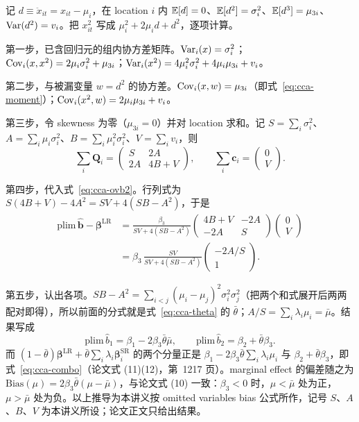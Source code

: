 \begin{intuition}
记 $d\equiv\ddot{x}_{it}=x_{it}-\mu_i$，在 location $i$ 内 $\mathbb{E}[d]=0$、$\mathbb{E}[d^2]=\sigma_i^2$、$\mathbb{E}[d^3]=\mu_{3i}$、$\operatorname{Var}(d^2)=v_i$。把 $x_{it}^2$ 写成 $\mu_i^2+2\mu_i d+d^2$，逐项计算。

第一步，已含回归元的组内协方差矩阵。$\operatorname{Var}_i(x)=\sigma_i^2$；$\operatorname{Cov}_i(x,x^2)=2\mu_i\sigma_i^2+\mu_{3i}$；$\operatorname{Var}_i(x^2)=4\mu_i^2\sigma_i^2+4\mu_i\mu_{3i}+v_i$。

第二步，与被漏变量 $w=d^2$ 的协方差。$\operatorname{Cov}_i(x,w)=\mu_{3i}$（即式~\ref{eq:cca-moment}）；$\operatorname{Cov}_i(x^2,w)=2\mu_i\mu_{3i}+v_i$。

第三步，令 skewness 为零（$\mu_{3i}=0$）并对 location 求和。记 $S=\sum_i\sigma_i^2$、$A=\sum_i\mu_i\sigma_i^2$、$B=\sum_i\mu_i^2\sigma_i^2$、$V=\sum_i v_i$，则
\begin{equation*}
\sum_i\mathbf{Q}_i=\begin{pmatrix} S & 2A\\ 2A & 4B+V\end{pmatrix},\qquad
\sum_i\mathbf{c}_i=\begin{pmatrix}0\\ V\end{pmatrix}.
\end{equation*}

第四步，代入式~\ref{eq:cca-ovb2}。行列式为 $S(4B+V)-4A^2=SV+4(SB-A^2)$，于是
\begin{align*}
\mathrm{plim}\,\widehat{\mathbf{b}}-\boldsymbol{\beta}^{\mathrm{LR}}
&=\frac{\beta_3}{SV+4(SB-A^2)}\begin{pmatrix}4B+V & -2A\\ -2A & S\end{pmatrix}\begin{pmatrix}0\\ V\end{pmatrix}\\
&=\beta_3\,\frac{SV}{SV+4(SB-A^2)}\begin{pmatrix}-2A/S\\ 1\end{pmatrix}.
\end{align*}

第五步，认出各项。$SB-A^2=\sum_{i<j}(\mu_i-\mu_j)^2\sigma_i^2\sigma_j^2$（把两个和式展开后两两配对即得），所以前面的分式就是式~\ref{eq:cca-theta} 的 $\bar\theta$；$A/S=\sum_i\lambda_i\mu_i=\bar\mu$。结果写成
\begin{equation*}
\mathrm{plim}\,\widehat{b}_1=\beta_1-2\beta_3\bar\theta\bar\mu,\qquad
\mathrm{plim}\,\widehat{b}_2=\beta_2+\bar\theta\beta_3 .
\end{equation*}
而 $(1-\bar\theta)\boldsymbol{\beta}^{\mathrm{LR}}+\bar\theta\sum_i\lambda_i\boldsymbol{\beta}^{\mathrm{SR}}_i$ 的两个分量正是 $\beta_1-2\beta_3\bar\theta\sum_i\lambda_i\mu_i$ 与 $\beta_2+\bar\theta\beta_3$，即式~\ref{eq:cca-combo}（论文式 (11)(12)，第~1217 页）。marginal effect 的偏差随之为 $\mathrm{Bias}(\mu)=2\beta_3\bar\theta(\mu-\bar\mu)$，与论文式 (10) 一致：$\beta_3<0$ 时，$\mu<\bar\mu$ 处为正，$\mu>\bar\mu$ 处为负。以上推导为本讲义按 omitted variables bias 公式所作，记号 $S$、$A$、$B$、$V$ 为本讲义所设；论文正文只给出结果。
\end{intuition}

